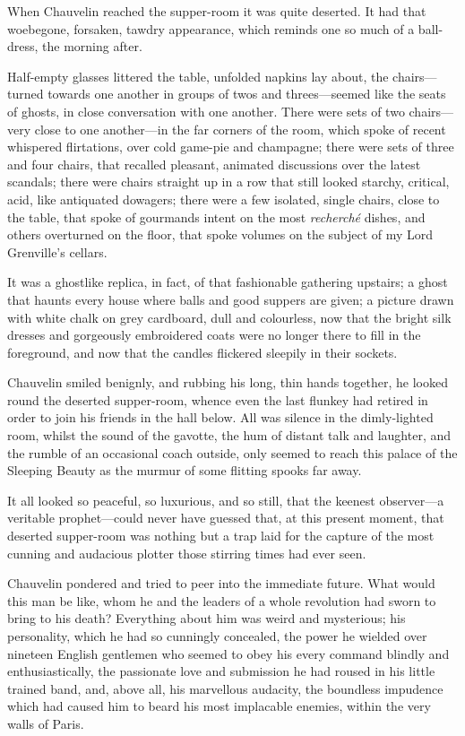 \documentclass[paper=a5,BCOR=7mm,twoside,DIV=calc,12pt,usegeometry,chapterprefix,endperiod,headings=big]{scrbook}
\begin{document}
When Chauvelin reached the supper-room it was quite deserted. It had that woebegone, forsaken, tawdry appearance, which reminds one so much of a ball-dress, the morning after.

Half-empty glasses littered the table, unfolded napkins lay about, the chairs---turned towards one another in groups of twos and threes---seemed like the seats of ghosts, in close conversation with one another. There were sets of two chairs---very close to one another---in the far corners of the room, which spoke of recent whispered flirtations, over cold game-pie and champagne; there were sets of three and four chairs, that recalled pleasant, animated discussions over the latest scandals; there were chairs straight up in a row that still looked starchy, critical, acid, like antiquated dowagers; there were a few isolated, single chairs, close to the table, that spoke of gourmands intent on the most \textit{recherché} dishes, and others overturned on the floor, that spoke volumes on the subject of my Lord Grenville's cellars.

It was a ghostlike replica, in fact, of that fashionable gathering upstairs; a ghost that haunts every house where balls and good suppers are given; a picture drawn with white chalk on grey cardboard, dull and colourless, now that the bright silk dresses and gorgeously embroidered coats were no longer there to fill in the foreground, and now that the candles flickered sleepily in their sockets.

Chauvelin smiled benignly, and rubbing his long, thin hands together, he looked round the deserted supper-room, whence even the last flunkey had retired in order to join his friends in the hall below. All was silence in the dimly-lighted room, whilst the sound of the gavotte, the hum of distant talk and laughter, and the rumble of an occasional coach outside, only seemed to reach this palace of the Sleeping Beauty as the murmur of some flitting spooks far away.

It all looked so peaceful, so luxurious, and so still, that the keenest observer---a veritable prophet---could never have guessed that, at this present moment, that deserted supper-room was nothing but a trap laid for the capture of the most cunning and audacious plotter those stirring times had ever seen.

Chauvelin pondered and tried to peer into the immediate future. What would this man be like, whom he and the leaders of a whole revolution had sworn to bring to his death? Everything about him was weird and mysterious; his personality, which he had so cunningly concealed, the power he wielded over nineteen English gentlemen who seemed to obey his every command blindly and enthusiastically, the passionate love and submission he had roused in his little trained band, and, above all, his marvellous audacity, the boundless impudence which had caused him to beard his most implacable enemies, within the very walls of Paris.
\end{document}
